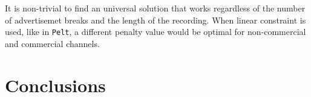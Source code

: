 It is non-trivial to find an universal solution that works regardless of the number of advertisemet breaks and the length of the recording. When linear constraint is used, like in \texttt{Pelt}, a different penalty value would be optimal for non-commercial and commercial channels.






\section{Conclusions} \label{sec:conclusions}
